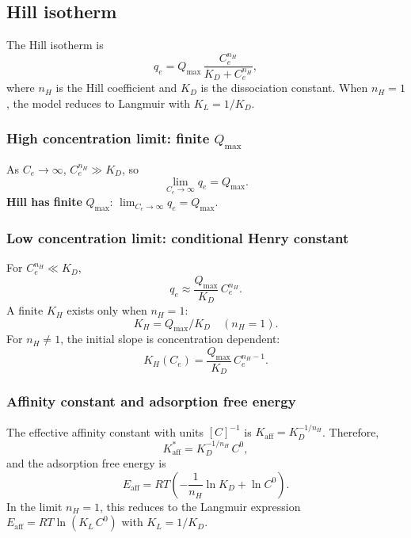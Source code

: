\documentclass[journal=jacsat,manuscript=article]{achemso}
\begin{document}
\subsection{Hill isotherm}
\label{sec:si_hill}

The Hill isotherm is
\begin{equation}
	q_e = Q_{\max}\,\frac{C_e^{n_H}}{K_D + C_e^{n_H}},
	\label{eq:si_hill}
\end{equation}
where $n_H$ is the Hill coefficient and $K_D$ is the dissociation constant.
When $n_H = 1$, the model reduces to Langmuir with $K_L = 1/K_D$.

\subsubsection{High concentration limit: finite $Q_{\max}$}

As $C_e \to \infty$, $C_e^{n_H} \gg K_D$, so
\begin{equation}
	\lim_{C_e \to \infty} q_e = Q_{\max}.
\end{equation}
\textbf{Hill has finite }$Q_{\max}$:\quad
$\displaystyle \lim_{C_e \to \infty} q_e = Q_{\max}$.

\subsubsection{Low concentration limit: conditional Henry constant}

For $C_e^{n_H} \ll K_D$,
\begin{equation}
	q_e \approx \frac{Q_{\max}}{K_D}\, C_e^{n_H}.
\end{equation}
A finite $K_H$ exists only when $n_H = 1$:
\begin{equation}
	K_H = Q_{\max}/K_D \quad (n_H = 1).
\end{equation}
For $n_H \neq 1$, the initial slope is concentration dependent:
\begin{equation}
	K_H(C_e) = \frac{Q_{\max}}{K_D}\, C_e^{n_H - 1}.
\end{equation}

\subsubsection{Affinity constant and adsorption free energy}

The effective affinity constant with units $[C]^{-1}$ is
$K_{\mathrm{aff}} = K_D^{-1/n_H}$. Therefore,
\begin{equation}
	K_{\mathrm{aff}}^{\ast} = K_D^{-1/n_H}\, C^0,
\end{equation}
and the adsorption free energy is
\begin{equation}
	\boxed{
		E_{\mathrm{aff}} = RT\!\left(-\frac{1}{n_H}\ln K_D + \ln C^0\right).
	}
\end{equation}
In the limit $n_H = 1$, this reduces to the Langmuir expression
$E_{\mathrm{aff}} = RT\ln(K_L\, C^0)$ with $K_L = 1/K_D$.
	
\end{document}
